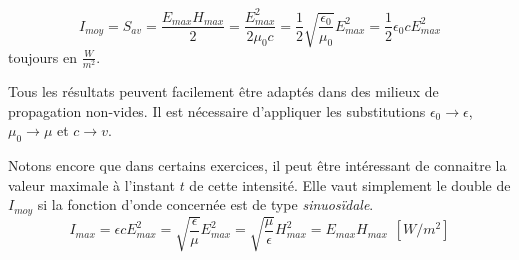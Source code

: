 \[I_{moy} = S_{av} = \frac{ E_{max} H_{max}}{2} = \frac{E_{max}^{2}}{2\mu_0c} = \frac{1}{2} \sqrt{\frac{\epsilon_0}{\mu_0}} E_{max}^{2} = \frac{1}{2}\epsilon_0 c E_{max}^{2}\]
toujours en $\frac{W}{m^{2}}$.

Tous les résultats peuvent facilement être adaptés dans des milieux de propagation non-vides. Il est nécessaire d'appliquer les substitutions $\epsilon_0 \rightarrow \epsilon$, $\mu_0 \rightarrow \mu$ et $c \rightarrow v $.




Notons encore que dans certains exercices, il peut être intéressant de connaitre la valeur maximale à l'instant $t$ de cette intensité. Elle vaut simplement le double de $I_{moy}$ si la fonction d'onde concernée est de type \textit{sinuosïdale}. 
\[I_{max} = \epsilon c E_{max}^{2} = \sqrt{\frac{\epsilon}{\mu}}E_{max}^{2} = \sqrt{\frac{\mu}{\epsilon}}H_{max}^{2} = E_{max} H_{max} \hspace{5pt} [W/m^{2}]\]



